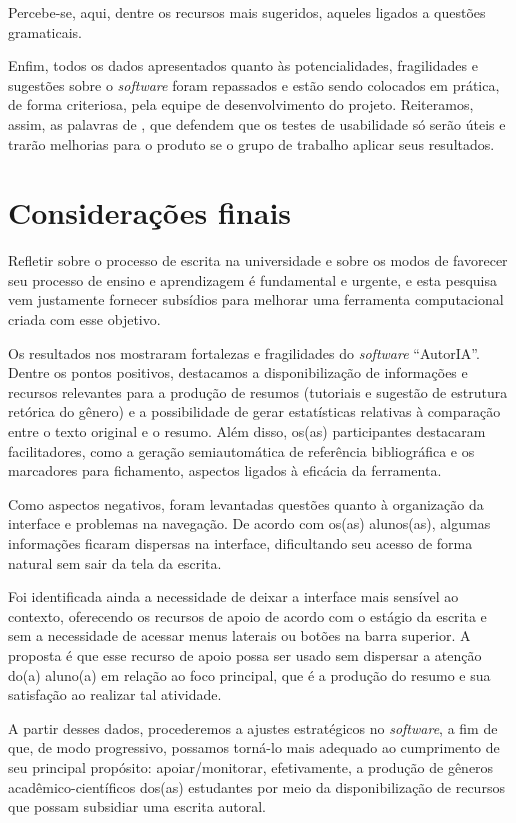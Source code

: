 \documentclass[portuguese]{textolivre}
\begin{document}
Percebe-se, aqui, dentre os recursos mais sugeridos, aqueles ligados a questões gramaticais.

Enfim, todos os dados apresentados quanto às potencialidades, fragilidades e sugestões sobre o \textit{software} foram repassados e estão sendo colocados em prática, de forma criteriosa, pela equipe de desenvolvimento do projeto. Reiteramos, assim, as palavras de \textcite{conrad2002}, que defendem que os testes de usabilidade só serão úteis e trarão melhorias para o produto se o grupo de trabalho aplicar seus resultados.

\section{Considerações finais}\label{sec-consideracoes-finais}
Refletir sobre o processo de escrita na universidade e sobre os modos de favorecer seu processo de ensino e aprendizagem é fundamental e urgente, e esta pesquisa vem justamente fornecer subsídios para melhorar uma ferramenta computacional criada com esse objetivo.

Os resultados nos mostraram fortalezas e fragilidades do \textit{software} “AutorIA”. Dentre os pontos positivos, destacamos a disponibilização de informações e recursos relevantes para a produção de resumos (tutoriais e sugestão de estrutura retórica do gênero) e a possibilidade de gerar estatísticas relativas à comparação entre o texto original e o resumo. Além disso, os(as) participantes destacaram facilitadores, como a geração semiautomática de referência bibliográfica e os marcadores para fichamento, aspectos ligados à eficácia da ferramenta.

Como aspectos negativos, foram levantadas questões quanto à organização da interface e problemas na navegação. De acordo com os(as) alunos(as), algumas informações ficaram dispersas na interface, dificultando seu acesso de forma natural sem sair da tela da escrita.

Foi identificada ainda a necessidade de deixar a interface mais sensível ao contexto, oferecendo os recursos de apoio de acordo com o estágio da escrita e sem a necessidade de acessar menus laterais ou botões na barra superior. A proposta é que esse recurso de apoio possa ser usado sem dispersar a atenção do(a) aluno(a) em relação ao foco principal, que é a produção do resumo e sua satisfação ao realizar tal atividade.

A partir desses dados, procederemos a ajustes estratégicos no \textit{software}, a fim de que, de modo progressivo, possamos torná-lo mais adequado ao cumprimento de seu principal propósito: apoiar/monitorar, efetivamente, a produção de gêneros acadêmico-científicos dos(as) estudantes por meio da disponibilização de recursos que possam subsidiar uma escrita autoral.
\end{document}
